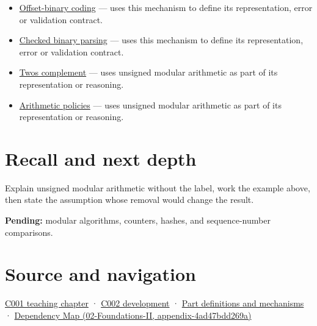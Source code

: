 \begin{itemize}
\item
  \hyperref[appendix-53a8cfb25f8d]{Offset-binary coding} --- uses this mechanism to define its representation, error or validation contract.
\item
  \hyperref[appendix-652d81568de9]{Checked binary parsing} --- uses this mechanism to define its representation, error or validation contract.
\item
  \hyperref[appendix-4fbc03d20829]{Two\textquotesingle s complement} --- uses unsigned modular arithmetic as part of its representation or reasoning.
\item
  \hyperref[appendix-2ed044358b82]{Arithmetic policies} --- uses unsigned modular arithmetic as part of its representation or reasoning.
\end{itemize}

\section{Recall and next depth}\label{appendix-c99977d88b33-recall-and-next-depth}

Explain unsigned modular arithmetic without the label, work the example above, then state the assumption whose removal would change the result.

\textbf{Pending:} modular algorithms, counters, hashes, and sequence-number comparisons.

\section{Source and navigation}\label{appendix-c99977d88b33-source-and-navigation}

\href{Continuous\%20Notes/Computing\%20Foundations\%20-\%20From\%20Bits\%20to\%20C++\%20and\%20Systems\%20APIs\#From\%20a\%20signal\%20to\%20an\%20interpretation}{C001 teaching chapter} · \href{Continuous\%20Notes/Computing\%20Foundations\%20-\%20From\%20Bits\%20to\%20C++\%20and\%20Systems\%20APIs\#Arithmetic\%20becomes\%20a\%20policy}{C002 development} · \hyperref[appendix-fd090d982a15]{Part definitions and mechanisms} · \href{../02-Foundations-II/main.pdf\#nameddest=appendix-4ad47bdd269a}{Dependency Map (02-Foundations-II, appendix-4ad47bdd269a)}

